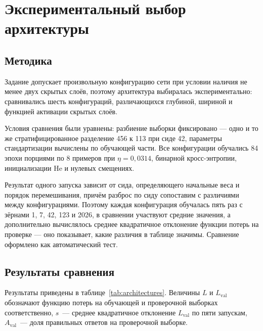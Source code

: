 \chapter{Экспериментальный выбор архитектуры}\label{ch:experiments}

\section{Методика}

Задание допускает произвольную конфигурацию сети при условии наличия не менее двух
скрытых слоёв, поэтому архитектура выбиралась экспериментально: сравнивались шесть
конфигураций, различающихся глубиной, шириной и функцией активации скрытых слоёв.

Условия сравнения были уравнены: разбиение выборки фиксировано --- одно и то же
стратифицированное разделение 456 к 113 при сиде 42, параметры стандартизации
вычислены по обучающей части. Все конфигурации обучались 84 эпохи порциями по 8 примеров
при $\eta = 0{,}0314$, бинарной кросс-энтропии, инициализации He и нулевых смещениях.

Результат одного запуска зависит от сида, определяющего начальные веса и порядок
перемешивания, причём разброс по сиду сопоставим с различиями между конфигурациями.
Поэтому каждая конфигурация обучалась пять раз с зёрнами 1, 7, 42, 123 и 2026, в
сравнении участвуют средние значения, а дополнительно вычислялось среднее квадратичное
отклонение функции потерь на проверке --- оно показывает, какие различия в таблице
значимы. Сравнение оформлено как автоматический тест.

\section{Результаты сравнения}

Результаты приведены в таблице~\ref{tab:architectures}. Величины $L$ и $L_{\text{val}}$
обозначают функцию потерь на обучающей и проверочной выборках соответственно, $s$~---
среднее квадратичное отклонение $L_{\text{val}}$ по пяти запускам, $A_{\text{val}}$~---
доля правильных ответов на проверочной выборке.

